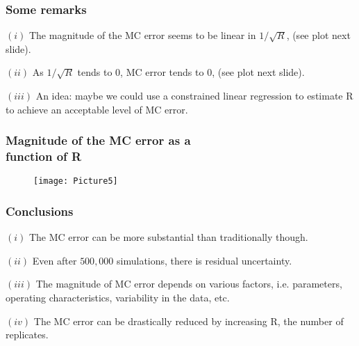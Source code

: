 \documentclass[border=5mm, convert, usenames, dvipsnames,beamer]{standalone}
\begin{document}
\begin{frame}[ fragile]{}

\frametitle{Some remarks }

\vspace{}
\noindent
$(i)$ \hspace{9} The magnitude of the MC error seems to be linear in $1 / \sqrt{R}$, (see plot next slide).

\vspace{10}
\noindent
$(ii)$ \hspace{9}  As $1 / \sqrt{R}$ tends to $0$, MC error tends to $0$, (see plot next slide).

\vspace{10}
\noindent
$(iii)$ \hspace{8} An idea: maybe we could use a constrained linear regression to estimate R to achieve an acceptable level of MC error.

\end{frame}






\begin{frame}[ fragile]{}

\frametitle{Magnitude of the MC error as a \\ function of R}


\vspace{15mm}
\noindent
\begin{figure}[h!]
\begin{center}
\texttt{[image: Picture5]}
\caption{}
\end{center}
\end{figure}





\end{frame}



\begin{frame}[ fragile]{}

\frametitle{Conclusions}

\vspace{15}
\noindent
$(i)$ \hspace{9} The MC error can be more substantial than traditionally though.

\vspace{10}
\noindent
$(ii)$ \hspace{9}  Even after $500,000$ simulations, there is residual uncertainty.

\vspace{10}
\noindent
$(iii)$  \hspace{8} The magnitude of MC error depends on various factors, i.e. parameters, operating characteristics, variability in the data, etc.


\vspace{10}
\noindent
$(iv)$  \hspace{9} The MC error can be drastically reduced by increasing R, the number of replicates.



\end{frame}
\end{document}
